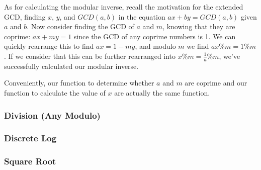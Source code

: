 As for calculating the modular inverse, recall the motivation for the extended GCD, finding $x$, $y$, and $GCD(a,b)$ in the equation $ax + by = GCD(a,b)$ given $a$ and $b$. Now consider finding the GCD of $a$ and $m$, knowing that they are coprime: $ax + my = 1$ since the GCD of any coprime numbers is 1. We can quickly rearrange this to find $ax = 1 - my$, and modulo $m$ we find $ax \% m = 1 \% m$. If we consider that this can be further rearranged into $x \% m = \frac{1}{a} \% m$, we've successfully calculated our modular inverse.

Conveniently, our function to determine whether $a$ and $m$ are coprime and our function to calculate the value of $x$ are actually the same function.

\subsubsection{Division (Any Modulo)}

\subsubsection{Discrete Log}

\subsubsection{Square Root}
